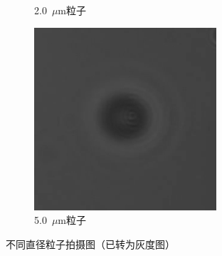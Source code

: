 \documentclass[a4paper]{report} %
\begin{document}
\begin{figure}[H]
\begin{subfigure}{0.3\textwidth}
        \caption{2.0~$\mu$m粒子}
    \end{subfigure}
    \begin{subfigure}{0.3\textwidth}
        \includegraphics[width=\linewidth]{5um.png}
        \caption{5.0~$\mu$m粒子}
    \end{subfigure}

    \caption{不同直径粒子拍摄图（已转为灰度图）}
\end{figure}


\end{document}
